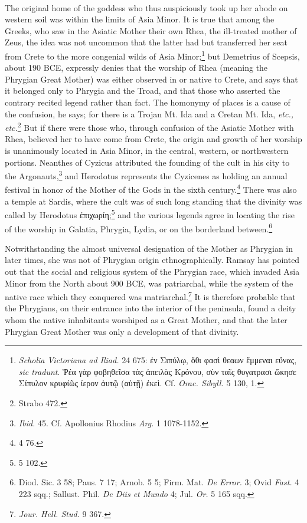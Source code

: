 \documentclass[a4paper, 11pt, oneside, polutonikogreek, french]{article}
\begin{document}
\paragraph{}
The original home of the goddess who thus auspiciously took up her abode on western soil was within the limits of Asia Minor. It is true that among the Greeks, who saw in the Asiatic Mother their own Rhea, the ill-treated mother of Zeus, the idea was not uncommon that the latter had but transferred her seat from Crete to the more congenial wilds of Asia Minor;\footnote{\emph{Scholia Victoriana ad Iliad.} 24 675: ἐν Σιπύλῳ, ὅθι φασὶ θεαων ἔμμεναι εὔνας, \emph{sic tradunt}. Ῥέα γὰρ φοβηθεῖσα τὰς ἀπειλὰς Κρόνου, σὺν ταῖς θυγατρασι ὤκησε Σίπυλον κρυφίῶς ίερον ἀυτῷ (αὐτῇ) ἐκεὶ. Cf. \emph{Orac. Sibyll.} 5 130, 1.} but Demetrius of Scepsis, about 190 \textsc{BCE}, expressly denies that the worship of Rhea (meaning the Phrygian Great Mother) was either observed in or native to Crete, and says that it belonged only to Phrygia and the Troad, and that those who asserted the contrary recited legend rather than fact. The homonymy of places is a cause of the confusion, he says; for there is a Trojan Mt. Ida and a Cretan Mt. Ida, \emph{etc., etc.}\footnote{Strabo 472.} But if there were those who, through confusion of the Asiatic Mother with Rhea, believed her to have come from Crete, the origin and growth of her worship is unanimously located in Asia Minor, in the central, western, or northwestern portions. Neanthes of Cyzicus attributed the founding of the cult in his city to the Argonauts,\footnote{\emph{Ibid.} 45. Cf. Apollonius Rhodius \emph{Arg.} 1 1078-1152.} and Herodotus represents the Cyzicenes as holding an annual festival in honor of the Mother of the Gods in the sixth century.\footnote{4 76.} There was also a temple at Sardis, where the cult was of such long standing that the divinity was called by Herodotus ἐπιχωρίη;\footnote{5 102.} and the various legends agree in locating the rise of the worship in Galatia, Phrygia, Lydia, or on the borderland between.\footnote{Diod. Sic. 3 58; Paus. 7 17; Arnob. 5 5; Firm. Mat. \emph{De Error.} 3; Ovid \emph{Fast.} 4 223 sqq.; Sallust. Phil. \emph{De Diis et Mundo} 4; Jul. \emph{Or.} 5 165 sqq.}

Notwithstanding the almost universal designation of the Mother as Phrygian in later times, she was not of Phrygian origin ethnographically. Ramsay has pointed out that the social and religious system of the Phrygian race, which invaded Asia Minor from the North about 900 \textsc{BCE}, was patriarchal, while the system of the native race which they conquered was matriarchal.\footnote{\emph{Jour. Hell. Stud.} 9 367.} It is therefore probable that the Phrygians, on their entrance into the interior of the peninsula, found a deity whom the native inhabitants worshiped as a Great Mother, and that the later Phrygian Great Mother was only a development of that divinity.
\end{document}
